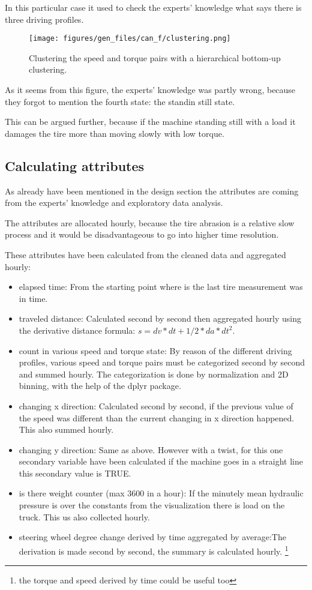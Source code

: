	In this particular case it used to check the experts' knowledge what says there is three driving profiles.
	\begin{figure}[H]
			\centering
			\texttt{[image: figures/gen\_files/can\_f/clustering.png]}
			\caption{Clustering the speed and torque pairs with a hierarchical bottom-up clustering.} 
	\end{figure}
	As it seems from this figure, the experts' knowledge was partly wrong, because they forgot to mention the fourth state: the standin still state.

	This can be argued further, because if the machine standing still with a load it damages the tire more than moving slowly with low torque.
\subsection{Calculating attributes}
As already have been mentioned in the design section the attributes are coming from the experts' knowledge and exploratory data analysis.

The attributes are allocated hourly, because the tire abrasion is a relative slow process and it would be disadvantageous to go into higher time resolution.

These attributes have been calculated from the cleaned data and aggregated hourly:
	\begin{itemize}
		\item{elapsed time:} From the starting point where is the last tire measurement was in time.
		\item{traveled distance:} Calculated second by second then aggregated hourly using the derivative distance formula: $s = dv*dt + 1/2*da*dt^2$.
		\item{count in various speed and torque state:} By reason of the different driving profiles, various speed and torque pairs must be categorized second by second and summed hourly. The categorization is done by normalization and 2D binning, with the help of the dplyr package.
		\item{changing x direction:} Calculated second by second, if the previous value of the speed was different than the current changing in x direction happened. This also summed hourly.
		\item{changing y direction:} Same as above. However with a twist, for this one secondary variable have been calculated if the machine goes in a straight line this secondary value is TRUE.
		\item{is there weight counter (max 3600 in a hour):} If the minutely mean hydraulic pressure is over the constants from the visualization there is load on the truck. This us also collected hourly.
		\item{steering wheel degree change derived by time aggregated by average:}The derivation is made second by second, the summary is calculated hourly.
		\footnote{the torque and speed derived by time could be useful too}
	\end{itemize}
